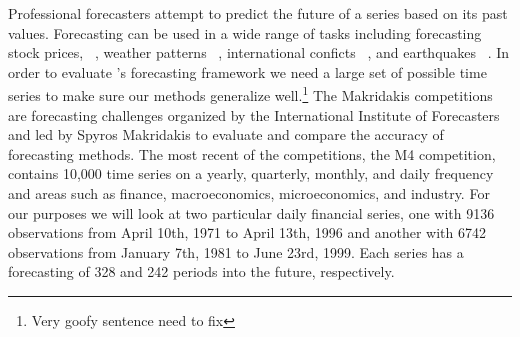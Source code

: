 \documentclass[article]{jss}\usepackage[]{graphicx}\usepackage[]{color}
\begin{document}
Professional forecasters attempt to predict the future of a series based on its past values. Forecasting can be used in a wide range of tasks including forecasting stock prices, ~\cite{GRANGER19923}, weather patterns ~\cite{MurphymeteoForecast}, international conficts ~\cite{Chadefaux01012014}, and earthquakes ~\cite{earthquakeYegu}. In order to evaluate 's forecasting framework we need a large set of possible time series to make sure our methods generalize well.\footnote{Very goofy sentence need to fix}
The Makridakis competitions ~\cite{Makridakis2000451} are forecasting challenges organized by the International Institute of Forecasters and led by Spyros Makridakis to evaluate and compare the accuracy of forecasting methods. The most recent of the competitions, the M4 competition, contains 10,000 time series on a yearly, quarterly, monthly, and daily frequency and areas such as finance, macroeconomics, microeconomics, and industry. For our purposes we will look at two particular daily financial series, one with 9136 observations from April 10th, 1971 to April 13th, 1996 and another with 6742 observations from January 7th, 1981 to June 23rd, 1999. Each series has a forecasting of 328 and 242 periods into the future, respectively.
\end{document}
